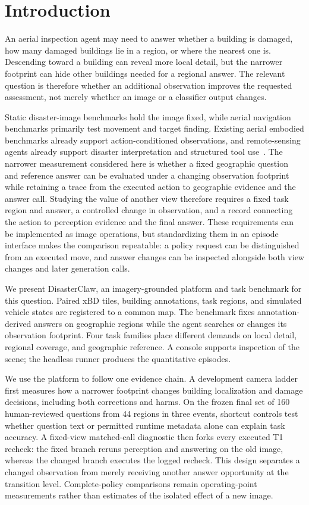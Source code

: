 \section{Introduction}
An aerial inspection agent may need to answer whether a building is damaged, how many damaged buildings lie in a region, or where the nearest one is. Descending toward a building can reveal more local detail, but the narrower footprint can hide other buildings needed for a regional answer. The relevant question is therefore whether an additional observation improves the requested assessment, not merely whether an image or a classifier output changes.

Static disaster-image benchmarks hold the image fixed, while aerial navigation benchmarks primarily test movement and target finding. Existing aerial embodied benchmarks already support action-conditioned observations, and remote-sensing agents already support disaster interpretation and structured tool use~\cite{liu2023aerialvln,gao2026openfly,guo2026bedi,zhao2025cityeqa,liu2024rescueadi,thinkgeo2025}. The narrower measurement considered here is whether a fixed geographic question and reference answer can be evaluated under a changing observation footprint while retaining a trace from the executed action to geographic evidence and the answer call. Studying the value of another view therefore requires a fixed task region and answer, a controlled change in observation, and a record connecting the action to perception evidence and the final answer. These requirements can be implemented as image operations, but standardizing them in an episode interface makes the comparison repeatable: a policy request can be distinguished from an executed move, and answer changes can be inspected alongside both view changes and later generation calls.

We present DisasterClaw, an imagery-grounded platform and task benchmark for this question. Paired xBD tiles, building annotations, task regions, and simulated vehicle states are registered to a common map. The benchmark fixes annotation-derived answers on geographic regions while the agent searches or changes its observation footprint. Four task families place different demands on local detail, regional coverage, and geographic reference. A console supports inspection of the scene; the headless runner produces the quantitative episodes.

We use the platform to follow one evidence chain. A development camera ladder first measures how a narrower footprint changes building localization and damage decisions, including both corrections and harms. On the frozen final set of 160 human-reviewed questions from 44 regions in three events, shortcut controls test whether question text or permitted runtime metadata alone can explain task accuracy. A fixed-view matched-call diagnostic then forks every executed T1 recheck: the fixed branch reruns perception and answering on the old image, whereas the changed branch executes the logged recheck. This design separates a changed observation from merely receiving another answer opportunity at the transition level. Complete-policy comparisons remain operating-point measurements rather than estimates of the isolated effect of a new image.

